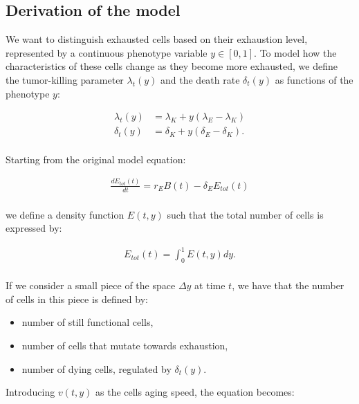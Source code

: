 \documentclass[12pt,a4paper]{article}
\begin{document}
\subsection{Derivation of the model}

We want to distinguish exhausted cells based on their exhaustion level, represented by a continuous phenotype variable $y \in [0,1]$. To model how the characteristics of these cells change as they become more exhausted, we define the tumor-killing parameter $\lambda_t(y)$ and the death rate $\delta_t(y)$ as functions of the phenotype $y$:

\begin{equation}
\begin{aligned}
\lambda_t(y) &= \lambda_K + y(\lambda_E - \lambda_K) \\ 
\delta_t(y) &= \delta_K + y(\delta_E - \delta_K).
\end{aligned}
\end{equation}
\\
Starting from the original model equation:

\begin{equation}
\begin{aligned}
\frac{dE_{tot}(t)}{dt} = r_E B(t) - \delta_E E_{tot}(t) \\
\end{aligned}
\end{equation}

we define a density function $E(t,y)$ such that the total number of cells is expressed by:

\begin{equation}
\begin{aligned}
E_{tot}(t)=\int^1_0 E(t,y)dy.\\
\end{aligned}
\end{equation}

If we consider a small piece of the space $\Delta y$ at time $t$, we have that the number of cells in this piece is defined by:
\begin{itemize}
    \item number of still functional cells,
    \item number of cells that mutate towards exhaustion,
    \item number of dying cells, regulated by $\delta_t(y)$.
\end{itemize}

Introducing $v(t,y)$ as the cells aging speed, the equation becomes:
\end{document}
